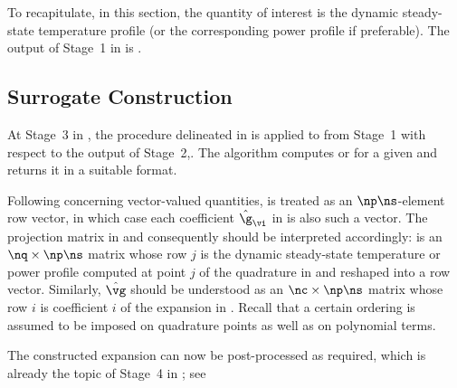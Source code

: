 To recapitulate, in this section, the quantity of interest \g is the dynamic
steady-state temperature profile \mq (or the corresponding power profile \mp if
preferable). The output of Stage~1 in  is
.

\subsection{Surrogate Construction}

At Stage~3 in , the procedure delineated in
 is applied to
 from Stage~1 with respect to the
output of Stage~2,. The algorithm computes \mp or \mq for a given \vu and
returns it in a suitable format.

Following  concerning vector-valued
quantities, \g is treated as an $\np \ns$-element row vector, in which case each
coefficient $\hat{\g}_{\vi}$ in  is also such a vector.
The projection matrix in  and consequently
 should be interpreted accordingly: \vg is an $\nq
\times \np \ns$ matrix whose row $j$ is the dynamic steady-state temperature or
power profile computed at point $j$ of the quadrature in
 and reshaped into a row vector. Similarly, $\hat{\vg}$
should be understood as an $\nc \times \np \ns$ matrix whose row $i$ is
coefficient $i$ of the expansion in . Recall that a
certain ordering is assumed to be imposed on quadrature points as well as on
polynomial terms.

The constructed expansion can now be post-processed as required, which is
already the topic of Stage~4 in ; see
